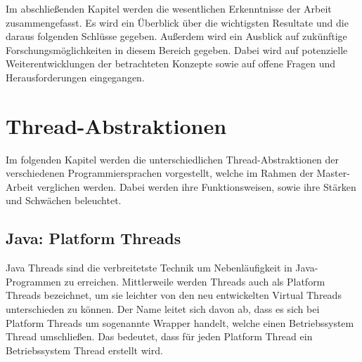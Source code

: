 \documentclass[fontsize=12pt,paper=a4,twoside=semi,parskip=half-,headsepline,headinclude]{scrreprt}
\begin{document}
Im abschließenden Kapitel werden die wesentlichen Erkenntnisse der Arbeit zusammengefasst. Es wird ein Überblick über die wichtigsten Resultate und die daraus folgenden Schlüsse gegeben. Außerdem wird ein Ausblick auf zukünftige Forschungsmöglichkeiten in diesem Bereich gegeben. Dabei wird auf potenzielle Weiterentwicklungen der betrachteten Konzepte sowie auf offene Fragen und Herausforderungen eingegangen.

\chapter{Thread-Abstraktionen}

Im folgenden Kapitel werden die unterschiedlichen Thread-Abstraktionen der verschiedenen Programmiersprachen vorgestellt, welche im Rahmen der Master-Arbeit verglichen werden. Dabei werden ihre Funktionsweisen, sowie ihre Stärken und Schwächen beleuchtet.

\section{Java: Platform Threads}

Java Threads sind die verbreitetste Technik um Nebenläufigkeit in Java-Programmen zu erreichen. Mittlerweile werden Threads auch als Platform Threads bezeichnet, um sie leichter von den neu entwickelten Virtual Threads unterschieden zu können. Der Name leitet sich davon ab, dass es sich bei Platform Threads um sogenannte Wrapper handelt, welche einen Betriebssystem Thread umschließen. Das bedeutet, dass für jeden Platform Thread ein Betriebssystem Thread erstellt wird.
\end{document}
